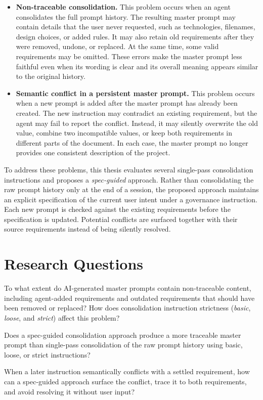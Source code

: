 \begin{itemize}[leftmargin=*]
\item \textbf{Non-traceable consolidation.}
This problem occurs when an agent consolidates the full prompt history. The
resulting master prompt may contain details that the user never requested,
such as technologies, filenames, design choices, or added rules. It may also
retain old requirements after they were removed, undone, or replaced. At the
same time, some valid requirements may be omitted. These errors make the
master prompt less faithful even when its wording is clear and its overall
meaning appears similar to the original history.

\item \textbf{Semantic conflict in a persistent master prompt.}
This problem occurs when a new prompt is added after the master prompt has
already been created. The new instruction may contradict an existing
requirement, but the agent may fail to report the conflict. Instead, it may
silently overwrite the old value, combine two incompatible values, or keep
both requirements in different parts of the document. In each case, the
master prompt no longer provides one consistent description of the project.
\end{itemize}

To address these problems, this thesis evaluates several single-pass
consolidation instructions and proposes a \emph{spec-guided} approach. Rather
than consolidating the raw prompt history only at the end of a session, the
proposed approach maintains an explicit specification of the current user
intent under a governance instruction. Each new prompt is checked against the
existing requirements before the specification is updated. Potential conflicts
are surfaced together with their source requirements instead of being silently
resolved.

\section{Research Questions}
\label{sec:research-questions}

\begin{description}[leftmargin=*,style=nextline]
\item[RQ1]
To what extent do AI-generated master prompts contain non-traceable content,
including agent-added requirements and outdated requirements that should
have been removed or replaced? How does consolidation instruction strictness
(\emph{basic}, \emph{loose}, and \emph{strict}) affect this problem?

\item[RQ2]
Does a spec-guided consolidation approach produce a more traceable master
prompt than single-pass consolidation of the raw prompt history using basic,
loose, or strict instructions?

\item[RQ3]
When a later instruction semantically conflicts with a settled requirement,
how can a spec-guided approach surface the conflict, trace it to both
requirements, and avoid resolving it without user input?
\end{description}

